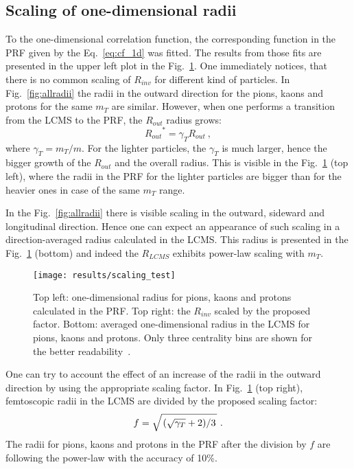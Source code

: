       \subsection{Scaling of one-dimensional radii}
      To the one-dimensional correlation function, the corresponding function in the PRF given by the Eq.~\ref{eq:cf_1d} was fitted.
      The results from those fits are presented in the upper left plot in the Fig.~\ref{fig:scaling_test}.
      One immediately notices, that there is no common scaling of $R_{inv}$ for different kind of particles.
      In Fig.~\ref{fig:allradii} the radii in the outward direction for the pions, kaons and protons for the same $m_T$ are similar.
      However, when one performs a transition from the LCMS to the PRF, the $R_{out}$ radius grows:
      \begin{equation}
        {R_{out}}^{*} = \gamma_T R_{out}~,
      \end{equation}
      where $\gamma_T = m_T / m$.
      For the lighter particles, the $\gamma_T$ is much larger, hence the bigger growth of the $R_{out}$ and the overall radius.
      This is visible in the Fig.~\ref{fig:scaling_test} (top left), where the radii in the PRF for the lighter particles are bigger than for the heavier ones in case of the same $m_T$ range.

      In the Fig.~\ref{fig:allradii} there is visible scaling in the outward, sideward and longitudinal direction.
      Hence one can expect an appearance of such scaling in a direction-averaged radius calculated in the LCMS.
      This radius is presented in the Fig.~\ref{fig:scaling_test} (bottom) and indeed the $R_{LCMS}$ exhibits power-law scaling with $m_T$.

      \begin{figure}[b]
        \centering
        \centerline{\texttt{[image: results/scaling\_test]}}
        \caption{Top left: one-dimensional radius for pions, kaons and protons calculated in the PRF. Top right: the $R_{inv}$ scaled by the proposed factor. Bottom: averaged one-dimensional radius in the LCMS for pions, kaons and protons. Only three centrality bins are shown for the better readability~\cite{galazyn}.}
      \label{fig:scaling_test}
      \end{figure}

      One can try to account the effect of an increase of the radii in the outward direction by using the appropriate scaling factor.
      In Fig.~\ref{fig:scaling_test} (top right), femtoscopic radii in the LCMS are divided by the proposed scaling factor:
      \begin{equation}
        f = \sqrt{ \left. \left( \sqrt{\gamma_T} + 2 \right) \middle/ 3 \right. }~.
      \end{equation}
      The radii for pions, kaons and protons in the PRF after the division by $f$ are following the power-law with the accuracy of 10\%.

